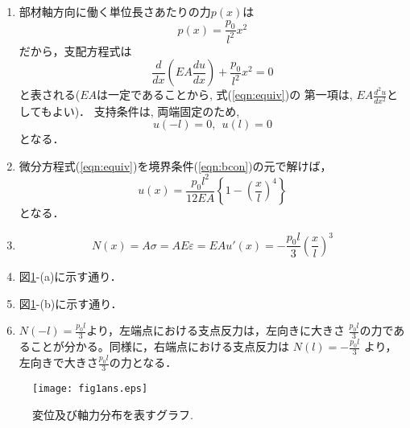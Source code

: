 \documentclass[10pt,a4j]{jarticle}
\begin{document}
\begin{enumerate}
\item
部材軸方向に働く単位長さあたりの力$p(x)$は
\begin{equation}
	p(x)= \frac{p_0}{l^2}x^2
	\label{eqn:body_force}
\end{equation}
だから，支配方程式は
\begin{equation}
	\frac{d}{dx  }\left( EA\frac{du}{dx}\right)
	+
	\frac{p_0}{l^2}x^2
	=0
	\label{eqn:equiv}
\end{equation}
と表される($EA$は一定であることから, 式(\ref{eqn:equiv})の
第一項は, $EA\frac{d^2u}{dx^2}$としてもよい)．
支持条件は, 両端固定のため,
\begin{equation}
	u(-l)=0, \ \ u(l)=0
	\label{eqn:bcon}
\end{equation}
となる．
\item
微分方程式(\ref{eqn:equiv})を境界条件(\ref{eqn:bcon})の元で解けば，
\begin{equation}
	u(x)=
	\frac{p_0l^2}{12EA}
	\left\{ 
		1-\left(\frac{x}{l}\right)^4
	\right\}
	\label{eqn:disp}
\end{equation}
となる．
\item
\begin{equation}
	N(x)= A \sigma = AE\varepsilon=EA u'(x)
	=
	-\frac{p_0l}{3}
		\left( \frac{x}{l} \right)^3 
\end{equation}
\item
図\ref{fig:fig1}-(a)に示す通り．
\item
図\ref{fig:fig1}-(b)に示す通り．
\item
	$N(-l)=\frac{p_0l}{3}$より，左端点における支点反力は，左向きに大きさ
	$\frac{p_0l}{3}$の力であることが分かる。同様に，右端点における支点反力は
	$N(l)=-\frac{p_0l}{3}$	より，左向きで大きさ$\frac{p_0l}{3}$の力となる．
\end{enumerate}
\begin{figure}[h]
	\vspace{-3mm}
	\begin{center}
	\texttt{[image: fig1ans.eps]} 
	\end{center}
	\vspace{-5mm}
	\caption{変位及び軸力分布を表すグラフ.} 
	\label{fig:fig1}
\end{figure}
\end{document}
